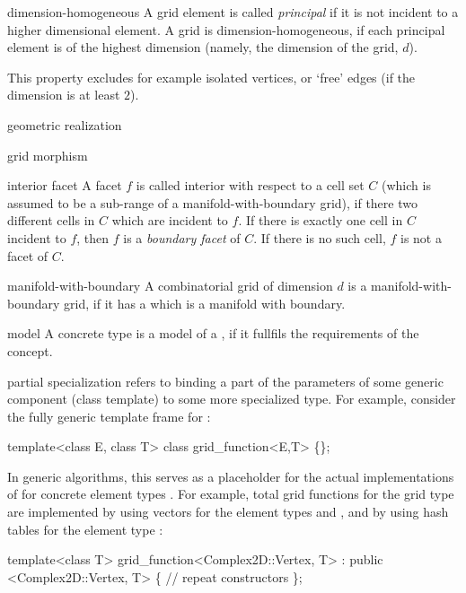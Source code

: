 \begin{Glossar}
\item[dimension-homogeneous]
  A grid element is called {\sl principal\/} if it is not incident to a higher dimensional element.
   A grid is dimension-homogeneous, if each principal element is of
   the highest dimension (namely, the dimension of the grid, $d$).

   This property excludes for example isolated vertices,
   or `free' edges (if the dimension is at least $2$).

\item[geometric realization]

\item[grid morphism]

\item[interior facet] A facet $f$ is called interior with respect to a cell set 
  $C$ (which is assumed to be a sub-range of a manifold-with-boundary grid),
  if there two different cells in $C$ which are incident to $f$.
  If there is exactly one cell in $C$ incident to $f$, then $f$ is a
  {\sl boundary facet\/} of $C$. If there is no such cell, $f$ is not a facet 
  of $C$.

\item[manifold-with-boundary]
  A combinatorial grid of dimension $d$ is a manifold-with-boundary grid,
  if it has a {\sl {}} which is a manifold with boundary.

\item[model]
  A concrete type is a model of a ,
  if it fullfils the requirements of the concept.

\item[partial specialization] refers to binding a part of the parameters 
  of some generic component (class template) to some more specialized type.
  For example, consider the fully generic template frame for 
  :
  \begin{example}
  template<class E, class T>
  class grid_function<E,T> \{\};
  \end{example}
  In generic algorithms, this serves as a placeholder for the actual implementations of 
   for concrete element  types .
  For example, total grid functions for the 
  grid type are implemented by using vectors for the element types 
  and , and by using hash tables for the element type :
  \begin{example}
  template<class T>
  grid_function<Complex2D::Vertex, T> 
    : public <Complex2D::Vertex, T> \{
    // repeat constructors
  \};


\end{example}
\end{Glossar}
